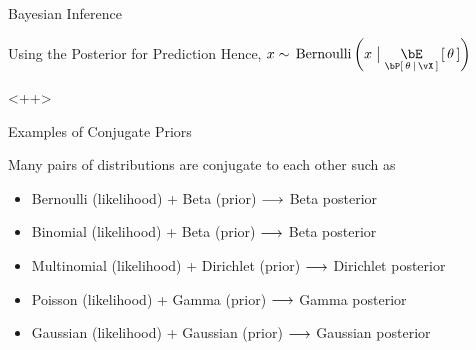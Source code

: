 \documentclass{article}
\begin{document}
\begin{ssection}{Bayesian Inference}
\begin{ssubsection}{Using the Posterior for Prediction}
		Hence, $x \sim \tfunc{Bernoulli}{x \pipe \E[\prob{\theta \,|\, \vX}]{\theta}}$ \br




	\end{ssubsection}<++>

	\begin{ssubsection}{Examples of Conjugate Priors}

		Many pairs of distributions are conjugate to each other such as
		\begin{itemize}
			\item Bernoulli (likelihood) + Beta (prior) $\longrightarrow$ Beta posterior
			\item Binomial (likelihood) + Beta (prior) $\longrightarrow$ Beta posterior
			\item Multinomial (likelihood) + Dirichlet (prior) $\longrightarrow$ Dirichlet posterior
			\item Poisson (likelihood) + Gamma (prior) $\longrightarrow$ Gamma posterior
			\item Gaussian (likelihood) + Gaussian (prior) $\longrightarrow$ Gaussian posterior
		\end{itemize}

	\end{ssubsection}

\end{ssection}
\end{document}
